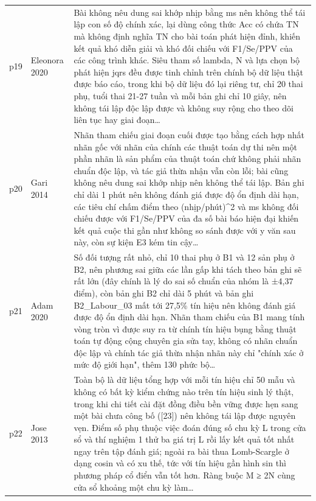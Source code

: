 \begin{longtable}{@{}L{1.05cm} L{3.2cm} L{10.1cm}@{}}
p19 & {\scriptsize Eleonora 2020} & {\scriptsize Bài không nêu dung sai khớp nhịp bằng ms nên không thể tái lập con số độ chính xác, lại dùng công thức Acc có chứa TN mà không định nghĩa TN cho bài toán phát hiện đỉnh, khiến kết quả khó diễn giải và khó đối chiếu với F1/Se/PPV của các công trình khác. Siêu tham số lambda, N và lựa chọn bộ phát hiện jqrs đều được tinh chỉnh trên chính bộ dữ liệu thật được báo cáo, trong khi bộ dữ liệu đó lại riêng tư, chỉ 20 thai phụ, tuổi thai 21-27 tuần và mỗi bản ghi chỉ 10 giây, nên không tái lập độc lập được và không suy rộng cho theo dõi liên tục hay giai đoạn…} \\[2pt]
p20 & {\scriptsize Gari 2014} & {\scriptsize Nhãn tham chiếu giai đoạn cuối được tạo bằng cách hợp nhất nhãn gốc với nhãn của chính các thuật toán dự thi nên một phần nhãn là sản phẩm của thuật toán chứ không phải nhãn chuẩn độc lập, và tác giả thừa nhận vẫn còn lỗi; bài cũng không nêu dung sai khớp nhịp nên không thể tái lập. Bản ghi chỉ dài 1 phút nên không đánh giá được độ ổn định dài hạn, các tiêu chí chấm điểm theo (nhịp/phút)\textasciicircum{}2 và ms không đối chiếu được với F1/Se/PPV của đa số bài báo hiện đại khiến kết quả cuộc thi gần như không so sánh được với y văn sau này, còn sự kiện E3 kém tin cậy…} \\[2pt]
p21 & {\scriptsize Adam 2020} & {\scriptsize Số đối tượng rất nhỏ, chỉ 10 thai phụ ở B1 và 12 sản phụ ở B2, nên phương sai giữa các lần gấp khi tách theo bản ghi sẽ rất lớn (đây chính là lý do sai số chuẩn của nhóm là ±4,37 điểm), còn bản ghi B2 chỉ dài 5 phút và bản ghi B2\_Labour\_03 mất tới 27,5\% tín hiệu nên không đánh giá được độ ổn định dài hạn. Nhãn tham chiếu của B1 mang tính vòng tròn vì được suy ra từ chính tín hiệu bụng bằng thuật toán tự động cộng chuyên gia sửa tay, không có nhãn chuẩn độc lập và chính tác giả thừa nhận nhãn này chỉ "chính xác ở mức độ giới hạn", thêm 130 phức bộ…} \\[2pt]
p22 & {\scriptsize Jose 2013} & {\scriptsize Toàn bộ là dữ liệu tổng hợp với mỗi tín hiệu chỉ 50 mẫu và không có bất kỳ kiểm chứng nào trên tín hiệu sinh lý thật, trong khi chi tiết cài đặt đồng điều bền vững được hẹn sang một bài chưa công bố ([23]) nên không tái lập được nguyên vẹn. Điểm số phụ thuộc việc đoán đúng số chu kỳ L trong cửa sổ và thí nghiệm 1 thử ba giá trị L rồi lấy kết quả tốt nhất ngay trên tập đánh giá; ngoài ra bài thua Lomb-Scargle ở dạng cosin và có xu thế, tức với tín hiệu gần hình sin thì phương pháp cổ điển vẫn tốt hơn. Ràng buộc M ≥ 2N cùng cửa sổ khoảng một chu kỳ làm…} \\[2pt]

\end{longtable}
